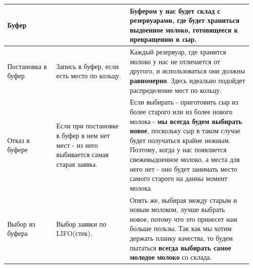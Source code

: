 \documentclass[a4paper, 14pt]{article}
\begin{document}
\begin{center}
\begin{tabular}{|p{0.2\linewidth} | p{0.3\linewidth}| p{0.5\linewidth}|}
		Буфер              &                                                                                      & Буфером у нас будет \textbf{склад с резервуарами}, где будет храниться выдоенное молоко, готовящееся к превращению в сыр.                                                                                                                                                                                                                                                                                                                                                                                                                                                                                                                                      \\
		\hline
		Постановка в буфер & Запись в буфер, если есть место по кольцу.                                           & Каждый резервуар, где хранится молоко у нас не отличается от другого, и использоваться они должны \textbf{равномерно}. Здесь идеально подойдет распределение мест по кольцу.                                                                                                                                                                                                                                                                                                                                                                                                                                                                                   \\
		\hline
		Отказ в буфере     & Если при постановке в буфер в нем нет мест - из него выбивается самая старая заявка. & Если выбирать - приготовить сыр из более старого или из более нового молока - \textbf{мы всегда будем выбирать новое}, поскольку сыр в таком случае будет получаться крайне нежным. Поэтому, когда у нас появляется свежевыдоенное молоко, а места для него нет - оно будет занимать место самого старого на данны момент молока.                                                                                                                                                                                                                                                                                                                              \\
		\hline
		Выбор из буфера    & Выбор заявки по LIFO(стек).                                                          & Опять же, выбирая между старым и новым молоком, лучше выбрать новое, потому что это принесет нам больше пользы. Так как мы хотим держать планку качества, то будем пытаться \textbf{всегда выбирать самое молодое молоко} со склада.                                                                                                                                                                                                                                                                                                                                                                                                                           \\

\end{tabular}
\end{center}
\end{document}
